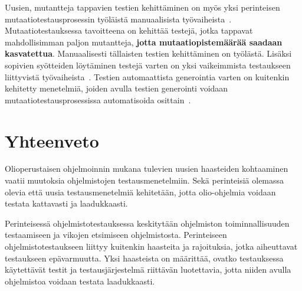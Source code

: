 \documentclass[finnish, grading]{tktltiki2}
\theoremstyle{definition}
\theoremstyle{remark}
\begin{document}
Uusien, mutantteja tappavien testien kehittäminen on myös yksi perinteisen mutaatiotestausprosessin työläistä manuaalisista työvaiheista~\cite[s. 39]{Offutt:Untch:2001}. Mutaatiotestauksessa tavoitteena on kehittää testejä, jotka tappavat mahdollisimman paljon mutantteja, \textbf{jotta mutaatiopistemäärää saadaan kasvatettua}. Manuaalisesti tällaisten testien kehittäminen on työlästä. Lisäksi sopivien syötteiden löytäminen testejä varten on yksi vaikeimmista testaukseen liittyvistä työvaiheista~\cite[s. 39]{Offutt:Untch:2001}. Testien automaattista generointia varten on kuitenkin kehitetty menetelmiä, joiden avulla testien generointi voidaan mutaatiotestausprosessissa automatisoida osittain~\cite[s. 39]{Offutt:Untch:2001}.







\section{Yhteenveto}

Olioperustaisen ohjelmoinnin mukana tulevien uusien haasteiden kohtaaminen vaatii muutoksia ohjelmistojen testausmenetelmiin. Sekä perinteisiä olemassa olevia että uusia testausmenetelmiä kehitetään, jotta olio-ohjelmia voidaan testata kattavasti ja laadukkaasti. 

Perinteisessä ohjelmistotestauksessa keskitytään ohjelmiston toiminnallisuuden testaamiseen ja vikojen etsimiseen ohjelmistosta. Perinteiseen ohjelmistotestaukseen liittyy kuitenkin haasteita ja rajoituksia, jotka aiheuttavat testaukseen epävarmuutta. Yksi haasteista on määrittää, ovatko testauksessa käytettävät testit ja testausjärjestelmä riittävän luotettavia, jotta niiden avulla ohjelmistoa voidaan testata laadukkaasti.
\end{document}
